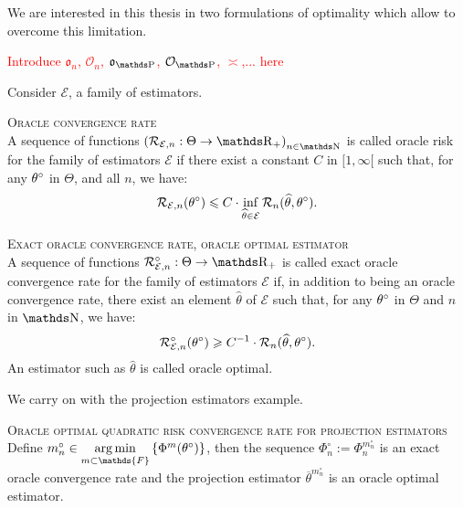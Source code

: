 \begin{Liste}[]
We are interested in this thesis in two formulations of optimality which allow to overcome this limitation.

\item[\mylabel{INTRO_FREQ_DECISION_ORACLEOPT}{ \bfseries{Oracle optimality}}]

\textcolor{red}{Introduce $\mathfrak{o}_{n}$, $\mathcal{O}_{n}$, $\mathfrak{o}_{\P}$, $\mathcal{O}_{\P}$, $\asymp$,... here}

Consider $\mathcal{E}$, a family of estimators.

\begin{de}{\textsc{Oracle convergence rate} \\}\label{DE_INTRO_FREQ_DECISION_ORACLEOPT_CONVRATE}
A sequence of functions $\left(\mathcal{R}_{\mathcal{E}, n} : \Theta \rightarrow \R_{+}\right)_{n \in \N}$ is called oracle risk for the family of estimators $\mathcal{E}$ if there exist a constant $C$ in $[1, \infty[$ such that, for any ${\theta^{\circ}_{}}$ in $\Theta$, and all $n$, we have:
\[\mathcal{R}_{\mathcal{E}, n}({\theta^{\circ}_{}}) \leqslant C \cdot \inf\limits_{\widehat{\theta} \in \mathcal{E}} \mathcal{R}_{n}(\widehat{\theta}, {\theta^{\circ}_{}}).\]
\end{de}

\begin{de}{\textsc{Exact oracle convergence rate, oracle optimal estimator} \\}\label{DE_INTRO_FREQ_DECISION_ORACLEOPT_EXACTCONVRATE}
A sequence of functions $\mathcal{R}^{\circ}_{\mathcal{E}, n} : \Theta \rightarrow \R_{+}$ is called exact oracle convergence rate for the family of estimators $\mathcal{E}$ if, in addition to being an oracle convergence rate, there exist an element $\widehat{\theta}$ of $\mathcal{E}$ such that, for any ${\theta^{\circ}_{}}$ in $\Theta$ and $n$ in $\N$, we have:
\[\mathcal{R}^{\circ}_{\mathcal{E}, n}({\theta^{\circ}_{}}) \geqslant C^{-1} \cdot \mathcal{R}_{n}(\widehat{\theta}, {\theta^{\circ}_{}}).\]
An estimator such as $\widehat{\theta}$ is called oracle optimal.
\end{de}

We carry on with the projection estimators example.

\begin{de}{\textsc{Oracle optimal quadratic risk convergence rate for projection estimators} \\}\label{DE_INTRO_FREQ_DECISION_ORACLEOPT_OPTPROJ}
Define $m^{\circ}_{n} \in \argmin\limits_{m \subset \mathds{F}}\left\{\Phi^{m}(\fxdf)\right\}$, then the sequence $\Phi_{n}^{\circ} := \Phi_{n}^{m_{n}^{\circ}}$ is an exact oracle convergence rate and the projection estimator $\overline{\theta}^{m_{n}^{\circ}}$ is an oracle optimal estimator.
\end{de}


\end{Liste}

